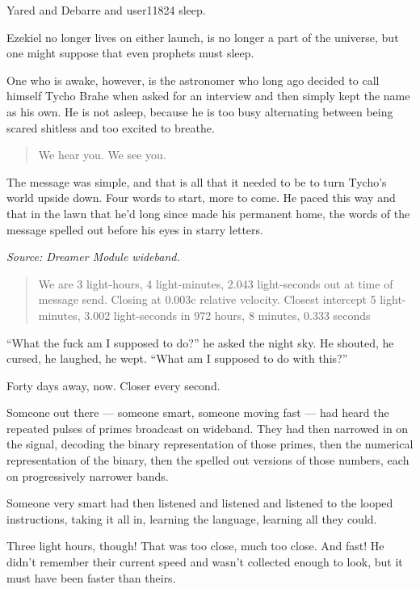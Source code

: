 Yared and Debarre and user11824 sleep.

Ezekiel no longer lives on either launch, is no longer a part of the universe, but one might suppose that even prophets must sleep.

One who is awake, however, is the astronomer who long ago decided to call himself Tycho Brahe when asked for an interview and then simply kept the name as his own. He is not asleep, because he is too busy alternating between being scared shitless and too excited to breathe.

\begin{quote}
We hear you. We see you.
\end{quote}

The message was simple, and that is all that it needed to be to turn Tycho's world upside down. Four words to start, more to come. He paced this way and that in the lawn that he'd long since made his permanent home, the words of the message spelled out before his eyes in starry letters.

\emph{Source: Dreamer Module wideband.}

\begin{quote}
We are 3 light-hours, 4 light-minutes, 2.043 light-seconds out at time of message send. Closing at 0.003c relative velocity. Closest intercept 5 light-minutes, 3.002 light-seconds in 972 hours, 8 minutes, 0.333 seconds
\end{quote}

``What the fuck am I supposed to do?'' he asked the night sky. He shouted, he cursed, he laughed, he wept. ``What am I supposed to do with this?''

Forty days away, now. Closer every second.

Someone out there — someone smart, someone moving fast — had heard the repeated pulses of primes broadcast on wideband. They had then narrowed in on the signal, decoding the binary representation of those primes, then the numerical representation of the binary, then the spelled out versions of those numbers, each on progressively narrower bands.

Someone very smart had then listened and listened and listened to the looped instructions, taking it all in, learning the language, learning all they could.

Three light hours, though! That was too close, much too close. And fast! He didn't remember their current speed and wasn't collected enough to look, but it must have been faster than theirs.

